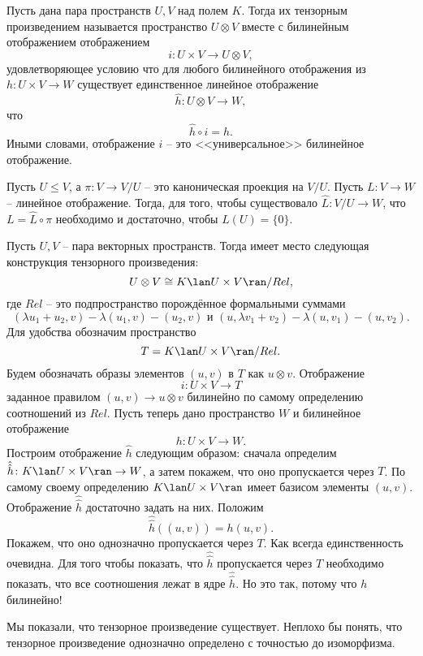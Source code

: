 \dfn Пусть дана пара пространств $U,V$ над полем $K$. Тогда их тензорным произведением называется пространство 
$U\otimes V$ вместе с билинейным отображением отображением
$$i \colon U \times  V \to U \otimes V,$$
удовлетворяющее условию что для любого билинейного отображения из $h\colon U \times V \to W$ существует единственное линейное отображение 
$$\hat{h}\colon U\otimes V \to W,$$
что 
$$\hat{h}\circ i=h.$$
Иными словами, отображение $i$ -- это <<универсальное>> билинейное отображение.
\edfn 


\lm Пусть $U\leq V$, а $\pi \colon V \to V/U$ -- это каноническая проекция на $V/U$. Пусть $L\colon V \to W$ -- линейное отображение. Тогда, для того, чтобы существовало $\hat{L}\colon V/U \to W$, что $L=\hat{L}\circ \pi$ необходимо и достаточно, чтобы $L(U)=\{0\}$.
\elm





\thrm Пусть $U,V$ -- пара векторных пространств. Тогда имеет место следующая конструкция тензорного произведения:
$$U \otimes V \cong K\lan U \times V \ran / Rel,$$
где $Rel$ -- это подпространство порождённое формальными суммами
$$(\lambda u_1+u_2, v) - \lambda (u_1, v) - ( u_2,v) \text{ и } (u,\lambda v_1+v_2) - \lambda (u,v_1) - (u,v_2).$$ 
\proof Для удобства обозначим пространство
$$T=K\lan U \times V \ran / Rel.$$ Будем обозначать образы элементов $(u,v)$ в $T$ как  $u\otimes v$. Отображение $$i \colon U\times V \to T$$
заданное правилом  $(u,v) \to u \otimes v$
билинейно по самому определению соотношений из $Rel$. Пусть теперь дано пространство $W$ и билинейное отображение $$h \colon U \times V \to W.$$
Построим отображение $\hat{h}$ следующим образом: сначала определим $\hat{\hat{h}}\colon K\lan U \times V \ran \to W$, а затем покажем, что оно пропускается через $T$. По самому своему определению $K\lan U \times V\ran$ имеет базисом элементы $(u,v)$. Отображение $\hat{\hat{h}}$ достаточно задать на них. Положим $$\hat{\hat{h}}((u,v))=h(u,v).$$
Покажем, что оно однозначно пропускается через $T$. Как всегда единственность очевидна. Для того чтобы показать, что $\hat{\hat{h}}$ пропускается через $T$ необходимо показать, что все соотношения лежат в ядре $\hat{\hat{h}}$. Но это так, потому что $h$ билинейно! 
\endproof
\ethrm




Мы показали, что тензорное произведение существует. Неплохо бы понять, что тензорное произведение однозначно определено с точностью до изоморфизма. 


